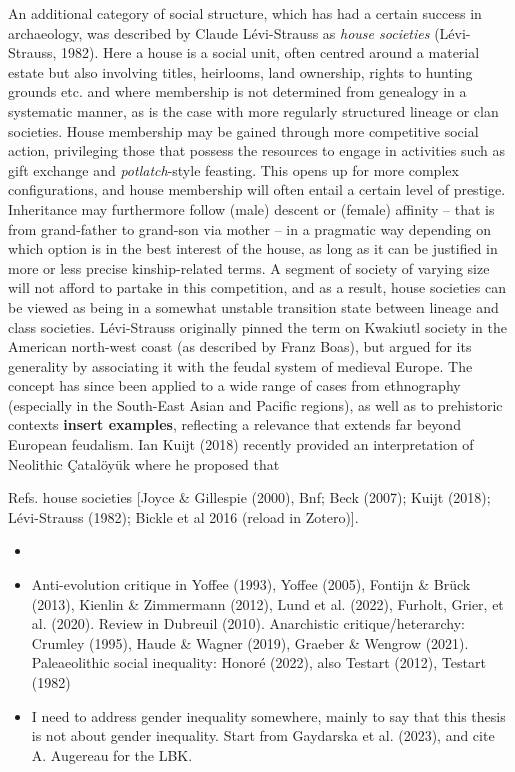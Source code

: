 \documentclass[
  12pt,
]{book}
\providecommand{\tightlist}{%
  \setlength{\itemsep}{0pt}\setlength{\parskip}{0pt}}
\begin{document}
An additional category of social structure, which has had a certain success in archaeology, was described by Claude Lévi-Strauss as \emph{house societies} (Lévi-Strauss, 1982). Here a house is a social unit, often centred around a material estate but also involving titles, heirlooms, land ownership, rights to hunting grounds etc. and where membership is not determined from genealogy in a systematic manner, as is the case with more regularly structured lineage or clan societies. House membership may be gained through more competitive social action, privileging those that possess the resources to engage in activities such as gift exchange and \emph{potlatch}-style feasting. This opens up for more complex configurations, and house membership will often entail a certain level of prestige. Inheritance may furthermore follow (male) descent or (female) affinity -- that is from grand-father to grand-son via mother -- in a pragmatic way depending on which option is in the best interest of the house, as long as it can be justified in more or less precise kinship-related terms. A segment of society of varying size will not afford to partake in this competition, and as a result, house societies can be viewed as being in a somewhat unstable transition state between lineage and class societies. Lévi-Strauss originally pinned the term on Kwakiutl society in the American north-west coast (as described by Franz Boas), but argued for its generality by associating it with the feudal system of medieval Europe. The concept has since been applied to a wide range of cases from ethnography (especially in the South-East Asian and Pacific regions), as well as to prehistoric contexts \textbf{insert examples}, reflecting a relevance that extends far beyond European feudalism. Ian Kuijt (2018) recently provided an interpretation of Neolithic Çatalöyük where he proposed that

Refs. house societies {[}Joyce \& Gillespie (2000), Bnf; Beck (2007); Kuijt (2018); Lévi-Strauss (1982); Bickle et al 2016 (reload in Zotero){]}.

\begin{itemize}
\tightlist
\item
\end{itemize}

\begin{itemize}
\tightlist
\item
  Anti-evolution critique in Yoffee (1993), Yoffee (2005), Fontijn \& Brück (2013), Kienlin \& Zimmermann (2012), Lund et al. (2022), Furholt, Grier, et al. (2020). Review in Dubreuil (2010). Anarchistic critique/heterarchy: Crumley (1995), Haude \& Wagner (2019), Graeber \& Wengrow (2021). Paleaeolithic social inequality: Honoré (2022), also Testart (2012), Testart (1982)
\item
  I need to address gender inequality somewhere, mainly to say that this thesis is not about gender inequality. Start from Gaydarska et al. (2023), and cite A. Augereau for the LBK.
\end{itemize}
\end{document}
